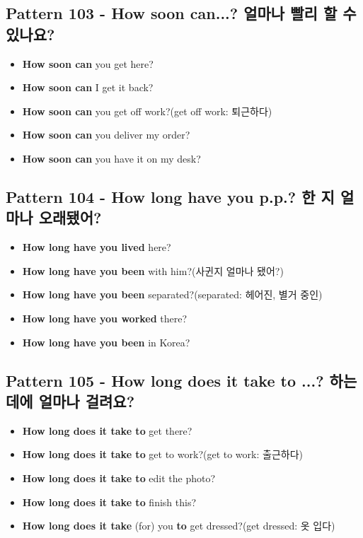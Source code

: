 \documentclass[11pt]{oblivoir}
\begin{document}
\subsection{Pattern 103 - How soon can...? 얼마나 빨리 \texttildelow 할 수 있나요?}
\begin{itemize}
  \item \textbf{How soon can} you get here?
  \item \textbf{How soon can} I get it back?
  \item \textbf{How soon can} you get off work?(get off work: 퇴근하다)
  \item \textbf{How soon can} you deliver my order?
  \item \textbf{How soon can} you have it on my desk?
\end{itemize}

\subsection{Pattern 104 - How long have you p.p.? \texttildelow 한 지 얼마나 오래됐어?}
\begin{itemize}
  \item \textbf{How long have you lived} here?
  \item \textbf{How long have you been} with him?(사귄지 얼마나 됐어?)
  \item \textbf{How long have you been} separated?(separated: 헤어진, 별거 중인)
  \item \textbf{How long have you worked} there?
  \item \textbf{How long have you been} in Korea?
\end{itemize}

\subsection{Pattern 105 - How long does it take to ...? \texttildelow 하는 데에 얼마나 걸려요?}
\begin{itemize}
  \item \textbf{How long does it take to} get there?
  \item \textbf{How long does it take to} get to work?(get to work: 출근하다)
  \item \textbf{How long does it take to} edit the photo?
  \item \textbf{How long does it take to} finish this?
  \item \textbf{How long does it take} (for) you \textbf{to} get dressed?(get dressed: 옷 입다)
\end{itemize}
\end{document}
